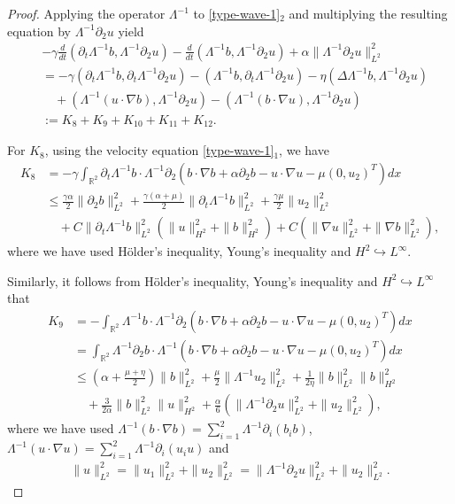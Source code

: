 \documentclass[reqno,11pt]{amsart}
\def\R{\mathbb R}
\numberwithin{Thm}{section}
\begin{document}
\begin{proof}
Applying the operator $\Lambda^{-1}$ to \eqref{type-wave-1}$_2$ and multiplying the resulting equation by $\Lambda^{-1}\partial_2 u$ yield
 \begin{align}\label{F22}
&-\gamma\frac{d}{dt}(\partial_t\Lambda^{-1}b,\Lambda^{-1}\partial_2u)-\frac{d}{dt}(\Lambda^{-1}b,\Lambda^{-1}\partial_2u)+\alpha\|\Lambda^{-1}\partial_2u\|_{L^2}^2\nonumber\\
&=-\gamma(\partial_t\Lambda^{-1}b,\partial_t\Lambda^{-1}\partial_2u)-(\Lambda^{-1}b,\partial_t\Lambda^{-1}\partial_2u)-\eta(\Delta\Lambda^{-1} b,\Lambda^{-1}\partial_2u)\nonumber\\
&\quad+(\Lambda^{-1}(u\cdot\nabla b),\Lambda^{-1}\partial_2u)-(\Lambda^{-1}(b\cdot\nabla u),\Lambda^{-1}\partial_2u)\nonumber\\
&:=K_8+K_9+K_{10}+K_{11}+K_{12}.
\end{align}

\par For $K_8$, using the velocity equation \eqref{type-wave-1}$_1$, we have
\begin{align*}
K_8
&=-\gamma\int_{\R^2}\partial_t \Lambda^{-1}b\cdot\Lambda^{-1}\partial_2 (b\cdot\nabla b+\alpha\partial_2b-u\cdot\nabla u-\mu (0,u_2)^{T})dx\\
&\leq\frac{\gamma\alpha}{2}\|\partial_2b\|_{L^2}^2+\frac{\gamma(\alpha+\mu)}{2}\|\partial_t\Lambda^{-1}b\|_{L^2}^2+
\frac{\gamma\mu}{2}\|u_2\|_{L^2}^2\nonumber\\
&\quad+C\|\partial_t\Lambda^{-1} b\|_{L^{2}}^2(\| u\|_{H^{2}}^2+\| b\|_{H^{2}}^2)+C(\|\nabla u\|_{L^{2}}^2+\|\nabla b\|_{L^{2}}^2),
\end{align*}
where we have used  H\"{o}lder's inequality, Young's inequality and $H^2\hookrightarrow L^\infty$.

Similarly, it follows from H\"{o}lder's inequality, Young's inequality and $H^2\hookrightarrow L^\infty$ that
\begin{align*}
K_9
&=-\int_{\R^2} \Lambda^{-1}b\cdot \Lambda^{-1}\partial_2(b\cdot\nabla b+\alpha\partial_2b-u\cdot\nabla u-\mu (0,u_2)^{T})dx
\\&=\int_{\R^2} \Lambda^{-1}\partial_2 b\cdot\Lambda^{-1}(b\cdot\nabla b+\alpha\partial_2b-u\cdot\nabla u-\mu (0,u_2)^{T})dx\\
&\leq (\alpha+\frac{\mu+\eta}{2})\|b\|_{L^2}^2+
\frac{\mu}{2}\|\Lambda^{-1}u_2\|_{L^2}^2+\frac{1}{2\eta}\| b\|_{L^{2}}^2\| b\|_{H^{2}}^2\\
&\quad+\frac{3}{2\alpha}\| b\|_{L^{2}}^2\|u\|_{H^{2}}^2+\frac{\alpha}{6}(\|\Lambda^{-1}\partial_2 u\|_{L^{2}}^2+\| u_2\|_{L^{2}}^2),
\end{align*}
where we have used $\Lambda^{-1}(b\cdot\nabla b)=\sum\limits_{i=1}^2\Lambda^{-1}\partial_i(b_ib)$,  $\Lambda^{-1}(u\cdot\nabla u)=\sum\limits_{i=1}^2\Lambda^{-1}\partial_i(u_iu)$ and
\begin{align*}
 \|u\|_{L^{2}}^2 = \|u_1\|_{L^{2}}^2+ \|u_2\|_{L^{2}}^2=\|\Lambda^{-1}\partial_2 u\|_{L^{2}}^2+\| u_2\|_{L^{2}}^2.
\end{align*}


\end{proof}
\end{document}

